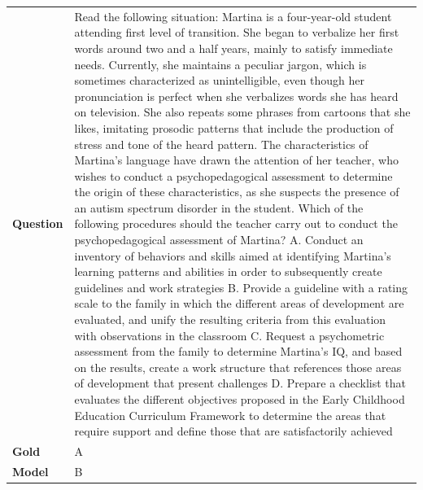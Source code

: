 \begin{longtable}{@{}l p{13cm}@{}}
  \textbf{Question}  & Read the following situation: Martina is a four-year-old student attending first level of transition. She began to verbalize her first words around two and a half years, mainly to satisfy immediate needs. Currently, she maintains a peculiar jargon, which is sometimes characterized as unintelligible, even though her pronunciation is perfect when she verbalizes words she has heard on television. She also repeats some phrases from cartoons that she likes, imitating prosodic patterns that include the production of stress and tone of the heard pattern. The characteristics of Martina's language have drawn the attention of her teacher, who wishes to conduct a psychopedagogical assessment to determine the origin of these characteristics, as she suspects the presence of an autism spectrum disorder in the student. Which of the following procedures should the teacher carry out to conduct the psychopedagogical assessment of Martina? \newline A. Conduct an inventory of behaviors and skills aimed at identifying Martina's learning patterns and abilities in order to subsequently create guidelines and work strategies \newline B. Provide a guideline with a rating scale to the family in which the different areas of development are evaluated, and unify the resulting criteria from this evaluation with observations in the classroom \newline C. Request a psychometric assessment from the family to determine Martina's IQ, and based on the results, create a work structure that references those areas of development that present challenges \newline D. Prepare a checklist that evaluates the different objectives proposed in the Early Childhood Education Curriculum Framework to determine the areas that require support and define those that are satisfactorily achieved   \\
  \textbf{Gold}      & A       \\
  \textbf{Model}     & B  \\

\end{longtable}
